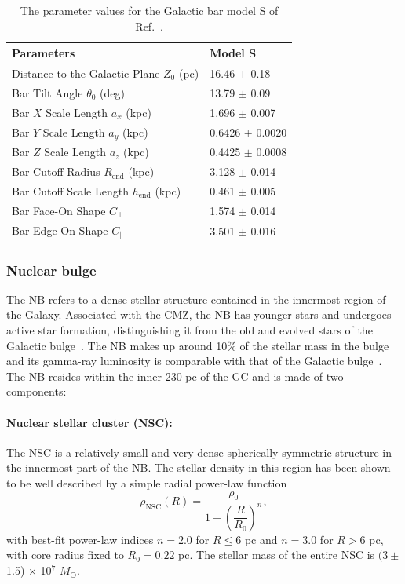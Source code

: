 \documentclass[%
reprint,
superscriptaddress,
amsmath,amssymb,
aps,
floatfix,
]{revtex4-1}
\begin{document}
\begin{table}[t!]
  \caption{\label{tab:modelS} The parameter values for the Galactic bar model S of Ref.~\cite{Freudenreich:1997bx}.}
  \begin{ruledtabular}
    \begin{tabular}{ll}
      Parameters & Model S \\ \hline
      Distance to the Galactic Plane $Z_0$ (pc) & 16.46 $\pm$ 0.18\\
      Bar Tilt Angle $\theta_0$ (deg) & 13.79 $\pm$ 0.09\\
      Bar $X$ Scale Length $a_x$ (kpc) & 1.696 $\pm$ 0.007 \\
      Bar $Y$ Scale Length $a_y$ (kpc) & 0.6426 $\pm$ 0.0020 \\
      Bar $Z$ Scale Length $a_z$ (kpc) & 0.4425 $\pm$ 0.0008 \\
      Bar Cutoff Radius $R_{\text{end}}$ (kpc) & 3.128 $\pm$ 0.014 \\
      Bar Cutoff Scale Length $h_{\text{end}}$ (kpc) & 0.461 $\pm$ 0.005 \\
      Bar Face-On Shape $C_\perp$ & 1.574 $\pm$ 0.014 \\
      Bar Edge-On Shape $C_\parallel$ & 3.501 $\pm$ 0.016
    \end{tabular}
  \end{ruledtabular}
\end{table}

\subsubsection{Nuclear bulge}\label{sec:nb}

The NB refers to a dense stellar structure contained in the innermost region of the Galaxy. Associated with the CMZ, the NB has younger stars and undergoes active star formation, distinguishing it from the old and evolved stars of the Galactic bulge~\cite{Launhardt:2002tx}. The NB makes up around 10\% of the stellar mass in the bulge and its gamma-ray luminosity is comparable with that of the Galactic bulge~\cite{Macias:2016nev,Bartels:2017vsx}. The NB resides within the inner 230 pc of the GC and is made of two components:

\paragraph{Nuclear stellar cluster (NSC):} The NSC is a relatively small and very dense spherically symmetric structure in the innermost part of the NB. The stellar density in this region has been shown~\cite{Launhardt:2002tx} to be well described by a simple radial power-law function
\begin{equation}\label{eq:NSC}
  \rho_{\text{NSC}}(R)=\dfrac{\rho_0}{1+\left(\dfrac{R}{R_0}\right)^{n}},
\end{equation}
with best-fit power-law indices $n = 2.0$ for $R \leq 6$ pc and $n = 3.0$ for $R > 6$ pc, with core radius fixed to $R_0 = 0.22$ pc. The stellar mass of the entire NSC is $(3\pm$ 1.5) $\times$ 10$^7$ $M_\odot$.
\end{document}
